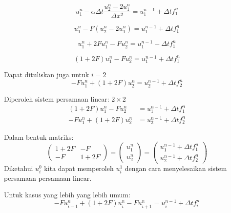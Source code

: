\begin{equation*}
u_{1}^{n}-\alpha\Delta t\frac{u_{2}^{n}-2u_{1}^{n}}{\Delta x^{2}}=u_{1}^{n-1}+\Delta tf_{1}^{n}
\end{equation*}

\begin{equation*}
u_{1}^{n}-F\left(u_{2}^{n}-2u_{1}^{n}\right)=u_{1}^{n-1}+\Delta tf_{1}^{n}
\end{equation*}

\begin{equation*}
u_{1}^{n} + 2Fu_{1}^{n} - Fu_{2}^{n} = u_{1}^{n-1} + \Delta t f_{1}^{n}
\end{equation*}

\begin{equation*}
(1 + 2F)u_{1}^{n} - Fu_{2}^{n} = u_{1}^{n-1} + \Delta t f_{1}^{n}
\end{equation*}


Dapat dituliskan juga untuk $i=2$
\begin{equation*}
-Fu_{1}^{n}+(1+2F)u_{2}^{n}=u_{2}^{n-1}+\Delta tf_{2}^{n}
\end{equation*}


Diperoleh sistem persamaan linear: $2\times2$
\begin{align*}
(1+2F)u_{1}^{n} - Fu_{2}^{n} & = u_{1}^{n-1} + \Delta t f_{1}^{n} \\
-Fu_{1}^{n} + (1+2F)u_{2}^{n} & = u_{2}^{n-1} + \Delta t f_{2}^{n}
\end{align*}

Dalam bentuk matriks:
\[
\left(\begin{array}{cc}
1+2F & -F\\
-F & 1+2F
\end{array}\right) = \left(\begin{array}{c}
u_{1}^{n}\\
u_{2}^{n}
\end{array}\right)=\left(\begin{array}{c}
u_{1}^{n-1}+\Delta tf_{1}^{n}\\
u_{2}^{n-1}+\Delta tf_{2}^{n}
\end{array}\right)
\]
Diketahui $u_{i}^{0}$ kita dapat memperoleh $u_{i}^{1}$ dengan cara
menyelesaikan sistem persamaan persamaan linear. 

Untuk kasus yang lebih yang lebih umum:
\[
-Fu_{i-1}^{n}+(1+2F)u_{i}^{n}-Fu_{i+1}^{n}=u_{i}^{n-1}+\Delta tf_{i}^{n}
\]

